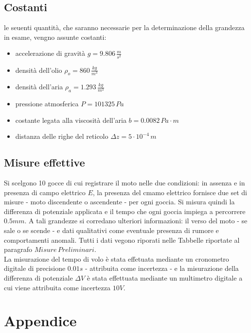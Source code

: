 \documentclass[]{article}
\let\oldsection\section%
\renewcommand{\section}{%
	\renewcommand{\theequation}{\thesection.\arabic{equation}}%
	\oldsection}%
\let\oldsubsection\subsection%
\renewcommand{\subsection}{%
	\renewcommand{\theequation}{\thesubsection.\arabic{equation}}%
	\oldsubsection}%
\begin{document}
    \subsection {Costanti}

    le seuenti quantità, che saranno necessarie per la determinazione della grandezza in esame, vengno assunte costanti:

    \begin{itemize}

        \item accelerazione di gravità $g = 9.806 \, \frac{m}{s^2}$
        \item densità dell'olio $\rho_o = 860 \, \frac{kg}{m^3}$
        \item densità dell'aria $\rho_a = 1.293 \, \frac{kg}{m^3}$
        \item pressione atmosferica $ P = 101325 \, Pa $
        \item costante legata alla viscosità dell'aria $b = 0.0082 \,  Pa \cdot m $
        \item distanza delle righe del reticolo $ \Delta z = 5 \cdot 10 ^{-4} \, m$
        
    \end{itemize}

    \subsection {Misure effettive}

    Si scelgono 10 gocce di cui registrare il moto nelle due condizioni: in assenza e in presenza di campo elettrico $ E $, la presenza del cmamo elettrico fornisce due set di misure - moto discendente o ascendente - per ogni goccia. Si misura quindi la differenza di potenziale applicata e il tempo che ogni goccia impiega a percorrere $ 0.5 mm $. A tali grandezze si corredano ulteriori informazioni: il verso del moto - se sale o se scende - e dati qualitativi come eventuale presenza di rumore e comportamenti anomali.
    Tutti i dati vegono riporati nelle Tabbelle riportate al paragrafo $Misure \, Preliminari$. \\ 
    
    La misurazione del tempo di volo è stata effetuata mediante un cronometro digitale di precisione $ 0.01 s $ - attribuita come incertezza - e la misurazione della differenza di potenziale $ \Delta V $ è stata effettuata mediante un multimetro digitale a cui viene attribuita come incertezza $ 10 V $.

    \section{Appendice}
\end{document}
